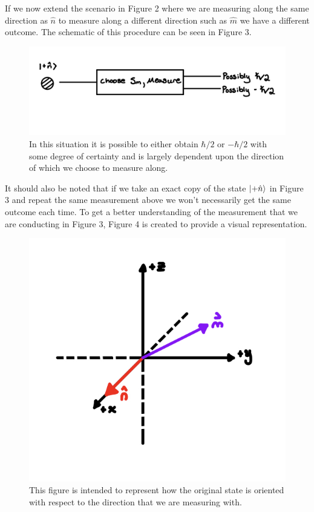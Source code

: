\documentclass[twocolumn]{article}
\begin{document}
\newline
If we now extend the scenario in Figure 2 where we are measuring along the same direction as $\hat{n}$ to measure along a different direction such as $\hat{m}$ we have a different outcome. The schematic of this procedure can be seen in Figure 3.
\begin{figure}[htbp]
\begin{center}
\includegraphics[width=1.00\linewidth]{Spin-With-M-Direction.jpg}
\caption{In this situation it is possible to either obtain $\hbar/2$ or $-\hbar/2$ with some degree of certainty and is largely dependent upon the direction of which we choose to measure along.}
\end{center}
\end{figure}
\newpage
It should also be noted that if we take an exact copy of the state $\ket{+\hat{n}}$ in Figure 3 and repeat the same measurement above we won't necessarily get the same outcome each time. To get a better understanding of the measurement that we are conducting in Figure 3, Figure 4 is created to provide a visual representation.
\begin{figure}[htbp]
\begin{center}
\includegraphics[width=0.75\linewidth]{Spin-With-M-and-N-Graph.jpg}
\caption{This figure is intended to represent how the original state is oriented with respect to the direction that we are measuring with.}
\end{center}
\end{figure}
\end{document}
